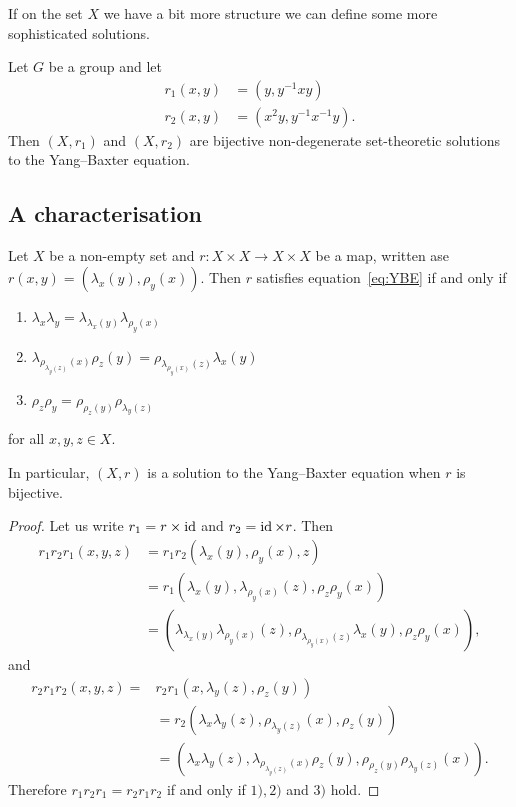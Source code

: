     If on the set $X$ we have a bit more structure we can define some more sophisticated solutions.
    \begin{example}
        Let $G$ be a group and let
        \begin{align*}
            r_1(x,y) &= (y, y^{-1}xy)\\
            r_2(x,y) &= (x^{2}y, y^{-1}x^{-1}y).
        \end{align*}
        Then $(X,r_1)$ and $(X,r_2)$ are bijective non-degenerate set-theoretic solutions to the Yang--Baxter equation.
    \end{example}

    \subsection{A characterisation}
    \begin{proposition}\label{prop:characterisation}
        Let $X$ be a non-empty set and $r: X \times X \to X \times X$ be a  map, written ase $r(x,y) = (\lambda_x(y),\rho_y(x))$. Then $r$ satisfies equation~\ref{eq:YBE} if and only if
    \begin{enumerate}
        \item $\lambda_x\lambda_y = \lambda_{\lambda_x(y)}\lambda_{\rho_y(x)}$
        \item $\lambda_{\rho_{\lambda_y(z)}(x)}\rho_z(y)=\rho_{\lambda_{\rho_y(x)}(z)}\lambda_x(y)$
        \item $\rho_z\rho_y=\rho_{\rho_z(y)}\rho_{\lambda_y(z)}$
    \end{enumerate}
    for all $x,y,z\in X$.

    In particular, $(X,r)$ is a solution to the Yang--Baxter equation when $r$ is bijective.
    \end{proposition}
    \begin{proof}
        Let us write $r_1=r\times \operatorname{id}$ and $r_2=\operatorname{id} \times r$. Then  
        \begin{align*}
            r_1r_2r_1(x,y,z)& = r_1r_2(\lambda_x(y),\rho_y(x),z) \\
            &= r_1(\lambda_x(y),\lambda_{\rho_y(x)}(z),\rho_z\rho_y(x))\\
            &= (\lambda_{\lambda_x(y)}\lambda_{\rho_y(x)}(z),\rho_{\lambda_{\rho_y(x)}(z)}\lambda_x(y),\rho_z\rho_y(x)),
        \end{align*}
        and 
        \begin{align*}
            r_2r_1r_2(x,y,z) =& r_2r_1(x,\lambda_y(z),\rho_z(y)) \\
            &= r_2(\lambda_x\lambda_y(z),\rho_{\lambda_y(z)}(x),\rho_z(y))\\
            &= (\lambda_x\lambda_y(z),\lambda_{\rho_{\lambda_y(z)}(x)}\rho_z(y),\rho_{\rho_z(y)}\rho_{\lambda_y(z)}(x)).
        \end{align*}
        Therefore $r_1r_2r_1= r_2r_1r_2$ if and only if $1), 2)$ and $3)$ hold.     
    \end{proof}


